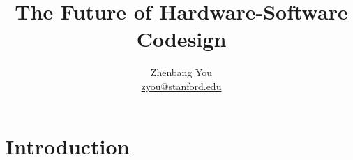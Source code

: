 \documentclass[11pt]{article}
\title{The Future of Hardware-Software Codesign}
\author{Zhenbang You\\ \href{zyou@stanford.edu}{zyou@stanford.edu}}
\date{}
\begin{document}
\maketitle

\section{Introduction}
\end{document}
